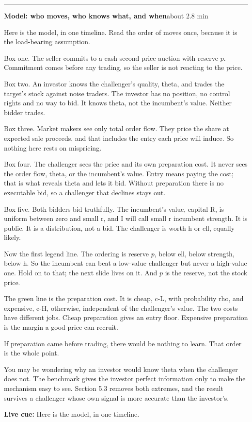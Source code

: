 \documentclass[11pt]{article}
\newcommand{\Cue}[1]{\par\nobreak\smallskip\noindent
  \textcolor{ScriptGray}{\footnotesize\textbf{Live cue:} #1}\par}
\newcommand{\scriptframe}[3]{%
  \Needspace{9\baselineskip}%
  \par\medskip\noindent\textcolor{ScriptBlue}{\rule{\linewidth}{0.55pt}}%
  \par\smallskip\noindent
  \textbf{#1}\hfill\textcolor{ScriptGray}{\small #2}\par\smallskip
  #3\par}
\begin{document}
\scriptframe{Model: who moves, who knows what, and when}{about 2.8 min}{%
  Here is the model, in one timeline. Read the order of moves once, because it
  is the load-bearing assumption.

  Box one. The seller commits to a cash second-price auction with reserve $p$.
  Commitment comes before any trading, so the seller is not reacting to the
  price.

  Box two. An investor knows the challenger's quality, theta, and trades the
  target's stock against noise traders. The investor has no position, no
  control rights and no way to bid. It knows theta, not the incumbent's value.
  Neither bidder trades.

  Box three. Market makers see only total order flow. They price the share at
  expected sale proceeds, and that includes the entry each price will induce.
  So nothing here rests on mispricing.

  Box four. The challenger sees the price and its own preparation cost. It never
  sees the order flow, theta, or the incumbent's value. Entry means paying the
  cost; that is what reveals theta and lets it bid. Without preparation there is
  no executable bid, so a challenger that declines stays out.

  Box five. Both bidders bid truthfully. The incumbent's value, capital R, is
  uniform between zero and small r, and I will call small r incumbent strength.
  It is public. It is a distribution, not a bid. The challenger is worth h or
  ell, equally likely.

  Now the first legend line. The ordering is reserve $p$, below ell, below
  strength, below h. So the incumbent can beat a low-value challenger but never
  a high-value one. Hold on to that; the next slide lives on it. And $p$ is the
  reserve, not the stock price.

  The green line is the preparation cost. It is cheap, c-L, with probability
  rho, and expensive, c-H, otherwise, independent of the challenger's value. The
  two costs have different jobs. Cheap preparation gives an entry floor.
  Expensive preparation is the margin a good price can recruit.

  If preparation came before trading, there would be nothing to learn. That
  order is the whole point.

  You may be wondering why an investor would know theta when the challenger
  does not. The benchmark gives the investor perfect information only to make
  the mechanism easy to see. Section 5.3 removes both extremes, and the result
  survives a challenger whose own signal is more accurate than the investor's.
  \Cue{Here is the model, in one timeline.}
}
\end{document}
